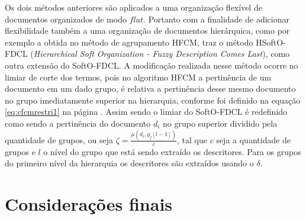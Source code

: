 Os dois métodos anteriores são aplicados a uma organização flexível de documentos organizados de
modo $flat$. Portanto com a finalidade de adicionar flexibilidade também a uma organização de
documentos hierárquica, como por exemplo a obtida no método de
agrupamento HFCM, \cite{Nogueira2013} traz o método HSoftO-FDCL (\textit{Hierarchical Soft
Organization - Fuzzy Description Comes Last\/}), como outra extensão do SoftO-FDCL. 
A modificação realizada nesse método ocorre no limiar de corte dos termos, pois no algoritmo HFCM a
pertinência de um documento em um dado grupo, é relativa a pertinência desse mesmo documento no
grupo imediatamente superior na hierarquia, conforme foi definido na equação \ref{eq:cfcmrestri1} na
página \pageref{eq:cfcmrestri1}. Assim sendo o limiar do SoftO-FDCL é redefinido como
sendo a pertinência do documento $d_i$ no grupo superior dividido pela quantidade de grupos, ou seja
$\zeta = \frac{\mu(d_i,g_j[l-1])}{c}$, tal que $c$ seja a quantidade de grupos e $l$ o nível do
grupo que está sendo extraído os descritores. Para os grupos do primeiro nível da hierarquia os
descritores são extraídos usando o $\delta$. 




 
\section{Considerações finais}
